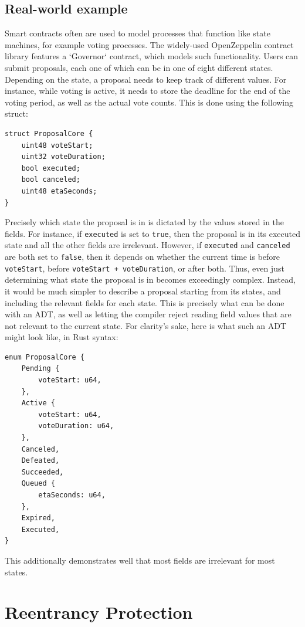 \subsection{Real-world example}
Smart contracts often are used to model processes that function like state machines, for example voting processes. The widely-used OpenZeppelin contract library features a `Governor` contract, which models such functionality. Users can submit proposals, each one of which can be in one of eight different states. Depending on the state, a proposal needs to keep track of different values. For instance, while voting is active, it needs to store the deadline for the end of the voting period, as well as the actual vote counts. This is done using the following struct:  
\begin{lstlisting}
struct ProposalCore {
    uint48 voteStart;
    uint32 voteDuration;
    bool executed;
    bool canceled;
    uint48 etaSeconds;
}
\end{lstlisting}
Precisely which state the proposal is in is dictated by the values stored in the fields. For instance, if \lstinline{executed} is set to \lstinline{true}, then the proposal is in its executed state and all the other fields are irrelevant. However, if \lstinline{executed} and \lstinline{canceled} are both set to \lstinline{false}, then it depends on whether the current time is before \lstinline{voteStart}, before \lstinline{voteStart + voteDuration}, or after both. Thus, even just determining what state the proposal is in becomes exceedingly complex. Instead, it would be much simpler to describe a proposal starting from its states, and including the relevant fields for each state. This is precisely what can be done with an ADT, as well as letting the compiler reject reading field values that are not relevant to the current state. For clarity's sake, here is what such an ADT might look like, in Rust syntax:
\begin{lstlisting}
enum ProposalCore {
    Pending {
        voteStart: u64,
    },
    Active {
        voteStart: u64,
        voteDuration: u64,
    },
    Canceled,
    Defeated,
    Succeeded,
    Queued {
        etaSeconds: u64,
    },
    Expired,
    Executed,
}
\end{lstlisting}
This additionally demonstrates well that most fields are irrelevant for most states.



\section{Reentrancy Protection}

